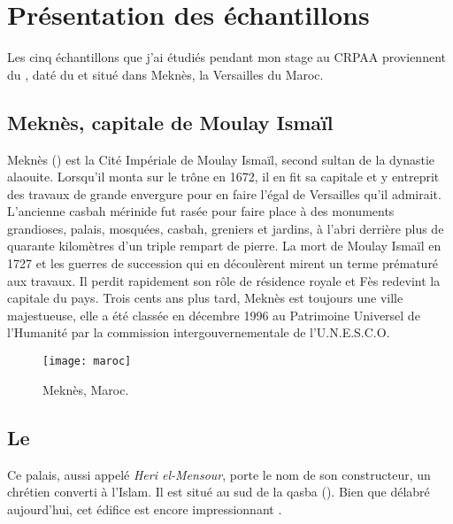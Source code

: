 
\chapter{Présentation des échantillons}

Les cinq échantillons que j'ai étudiés pendant mon stage au CRPAA 
proviennent du \PaM, daté du  et situé dans Meknès, 
la Versailles du Maroc.

\section{Meknès, capitale de Moulay Ismaïl}

Meknès () est la Cité Impériale de Moulay Ismaïl, 
second sultan de la dynastie alaouite. Lorsqu'il monta sur le trône 
en 1672, il en fit sa capitale et y entreprit des travaux de grande 
envergure pour en faire l'égal de Versailles qu'il admirait. 
L'ancienne casbah mérinide fut rasée pour faire place à des monuments 
grandioses, palais, mosquées, casbah, greniers et jardins, à l'abri 
derrière plus de quarante kilomètres d'un triple rempart de pierre. 
La mort de Moulay Ismaïl en 1727 et les guerres de succession qui 
en découlèrent mirent un terme prématuré aux travaux. Il perdit 
rapidement son rôle de résidence royale et Fès redevint la capitale 
du pays. Trois cents ans plus tard, Meknès est toujours une ville 
majestueuse, elle a été classée en décembre 1996 au Patrimoine 
Universel de l'Humanité par la commission intergouvernementale de 
l'U.N.E.S.C.O.

\begin{figure}[htb]
  \texttt{[image: maroc]}
  \caption{Meknès, Maroc.}
  \label{fig:maroc}
\end{figure}

\section{Le \PaM}

Ce palais, aussi appelé \emph{Heri el-Mensour}, porte le nom de son 
constructeur, un chrétien converti à l'Islam. Il est situé au sud de 
la qasba (). Bien que délabré aujourd'hui, cet 
édifice est encore impressionnant \autocite{Barrucand_1976}.

